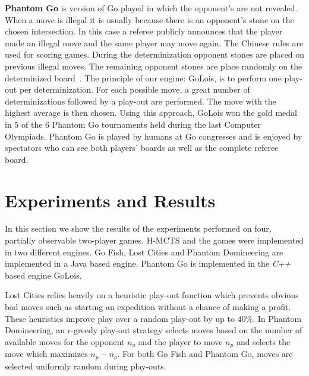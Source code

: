 \documentclass[a4paper]{llncs}
\begin{document}
{\sc \bf Phantom Go} is version of Go played in which the opponent's are not revealed. When a move is illegal it is usually because there is an opponent's stone on the chosen intersection. In this case a referee publicly announces that the player made an illegal move and the same player may move again. The Chinese rules are used for scoring games. During the determinization opponent stones are placed on previous illegal moves. The remaining opponent stones are place randomly on the determinized board~\cite{cazenave06}. The principle of our engine: {\sc GoLois}, is to perform one play-out per determinization. For each possible move, a great number of determinizations followed by a play-out are performed. The move with the highest average is then chosen. Using this approach, {\sc GoLois} won the gold medal in 5 of the 6 Phantom Go tournaments held during the last Computer Olympiads. Phantom Go is played by humans at Go congresses and is enjoyed by spectators who can see both players' boards as well as the complete referee board.

\section{Experiments and Results}
\label{sec:exp_res}
In this section we show the results of the experiments performed on four, partially observable two-player games. H-MCTS and the games were implemented in two different engines. Go Fish, Lost Cities and Phantom Domineering are implemented in a Java based engine. Phantom Go is implemented in the \emph{C++} based engine {\sc GoLois}.

Lost Cities relies heavily on a heuristic play-out function which prevents obvious bad moves such as starting an expedition without a chance of making a profit. These heuristics improve play over a random play-out by up to $40\%$. In Phantom Domineering, an $\epsilon$-greedy play-out strategy selects moves based on the number of available moves for the opponent $n_o$ and the player to move $n_p$ and selects the move which maximizes $n_p - n_o$. For both Go Fish and Phantom Go, moves are selected uniformly random during play-outs.
\end{document}
